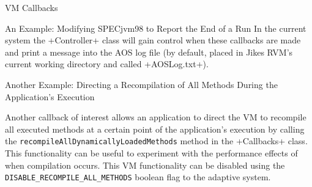 \begin{section}{VM Callbacks}
\begin{subsection}{An Example: Modifying SPECjvm98 to Report the End of a Run}
In the current system the \spverb+Controller+ class will gain control when these callbacks are made and print a message into the AOS log file (by default, placed in Jikes RVM's current working directory and called \spverb+AOSLog.txt+).

\end{subsection}

\begin{subsection}{Another Example: Directing a Recompilation of All Methods During the Application's Execution}

Another callback of interest allows an application to direct the VM to recompile all executed methods at a certain point of the application's execution by calling the \texttt{re\-com\-pi\-le\-All\-Dy\-na\-mi\-cal\-ly\-Loa\-ded\-Me\-thods} method in the \spverb+Callbacks+ class. This functionality can be useful to experiment with the performance effects of when compilation occurs. This VM functionality can be disabled using the \texttt{DIS\-ABLE\_RE\-COM\-PI\-LE\_ALL\_ME\-THODS} boolean flag to the adaptive system.

\end{subsection}

\end{section}
